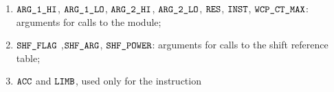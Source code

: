 \begin{enumerate}
    \item $\argOneHi$, $\argOneLo$, $\argTwoHi$, $\argTwoLo$, $\res$, $\INST$, $\wcpCtMax$:
	arguments for calls to the \wcpMod{} module;
    \item $\shfFlag$ ,$\shfArg$, $\shfPower$:
	arguments for calls to the shift reference table;
    \item $\accumulator$ and $\limb$,  used only for the  instruction
\end{enumerate}
